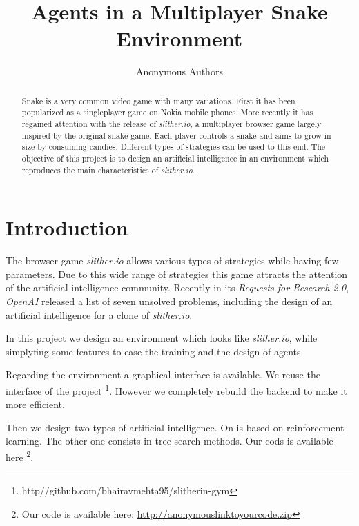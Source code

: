 \documentclass[journal, a4paper]{IEEEtran}
\begin{document}
\title{Agents in a Multiplayer Snake Environment}
\author{Anonymous Authors}
\maketitle

\begin{abstract}
Snake is a very common video game with many variations. First it has been popularized as a singleplayer game on Nokia mobile phones. More recently it has regained attention with the release of \emph{slither.io}, a multiplayer browser game largely inspired by the original snake game. Each player controls a snake and aims to grow in size by consuming candies. Different types of strategies can be used to this end. The objective of this project is to design an artificial intelligence in an environment which reproduces the main characteristics of \emph{slither.io}.

\end{abstract}

\section{Introduction}
The browser game \emph{slither.io} allows various types of strategies while having few parameters. Due to this wide range of strategies this game attracts the attention of the artificial intelligence community. Recently in its \emph{Requests for Research 2.0}, \emph{OpenAI} released a list of seven unsolved problems, including the design of an artificial intelligence for a clone of \emph{slither.io}.

In this project we design an environment which looks like \emph{slither.io}, while simplyfing some features to ease the training and the design of agents. 

Regarding the environment a graphical interface is available. We reuse the interface of the project 
\footnote{http//github.com/bhairavmehta95/slitherin-gym}. However we completely rebuild the backend to make it more efficient. 

Then we design two types of artificial intelligence. On is based on reinforcement learning. The other one consists in tree search methods. Our cods is available here \footnote{Our code is available here: \url{http://anonymouslinktoyourcode.zip}}.
\end{document}
